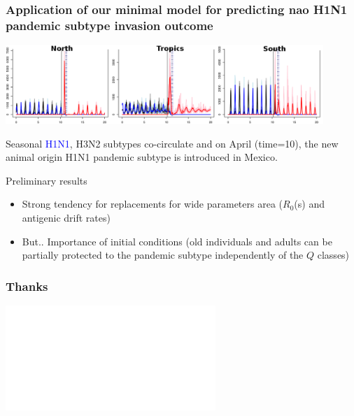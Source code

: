 \documentclass{beamer}
\begin{document}
\begin{frame}
  \frametitle{Application of our minimal model for predicting nao H1N1
    pandemic subtype invasion outcome}
  
  \begin{center}
    \includegraphics[width=0.9\textwidth]{graph/traj_replace.png}
  \end{center}

  \begin{footnotesize}
    Seasonal \textcolor{blue}{H1N1}, H3N2 subtypes co-circulate and on
    April (time=10), the \alert{new animal origin H1N1} pandemic
    subtype is introduced in Mexico.
  \end{footnotesize}

  \pause

  \begin{footnotesize}
  \begin{block}{Preliminary results}
    \begin{itemize}
    \item Strong tendency for replacements for wide parameters area
      ($R_0$(s) and antigenic drift rates)
    \item \alert{But..} Importance of initial conditions (old individuals and adults
      can be partially protected to the pandemic subtype independently
      of the $Q$ classes)
    \end{itemize}
  \end{block}
  \end{footnotesize}

\end{frame}








\begin{frame}
  \frametitle{Thanks}
  \begin{center} 
    \includegraphics<1>[width=1 \linewidth]{graph/thanks.pdf}
 \end{center}
\end{frame}
\end{document}
